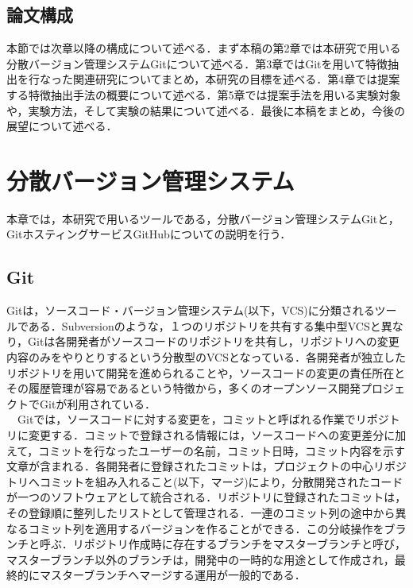 \documentclass{funthesis}
\begin{document}
\section{論文構成}
本節では次章以降の構成について述べる．まず本稿の第2章では本研究で用いる分散バージョン管理システムGitについて述べる．第3章ではGitを用いて特徴抽出を行なった関連研究についてまとめ，本研究の目標を述べる．第4章では提案する特徴抽出手法の概要について述べる．第5章では提案手法を用いる実験対象や，実験方法，そして実験の結果について述べる．最後に本稿をまとめ，今後の展望について述べる．
\chapter{分散バージョン管理システム} %

本章では，本研究で用いるツールである，分散バージョン管理システムGitと，GitホスティングサービスGitHubについての説明を行う．


\section{Git} %


Gitは，ソースコード・バージョン管理システム(以下，VCS)に分類されるツールである．Subversionのような，１つのリポジトリを共有する集中型VCSと異なり，Gitは各開発者がソースコードのリポジトリを共有し，リポジトリへの変更内容のみをやりとりするという分散型のVCSとなっている．各開発者が独立したリポジトリを用いて開発を進められることや，ソースコードの変更の責任所在とその履歴管理が容易であるという特徴から，多くのオープンソース開発プロジェクトでGitが利用されている．
\\　Gitでは，ソースコードに対する変更を，コミットと呼ばれる作業でリポジトリに変更する．コミットで登録される情報には，ソースコードへの変更差分に加えて，コミットを行なったユーザーの名前，コミット日時，コミット内容を示す文章が含まれる．各開発者に登録されたコミットは，プロジェクトの中心リポジトリへコミットを組み入れること(以下，マージ)により，分散開発されたコードが一つのソフトウェアとして統合される．リポジトリに登録されたコミットは，その登録順に整列したリストとして管理される．一連のコミット列の途中から異なるコミット列を適用するバージョンを作ることができる．この分岐操作をブランチと呼ぶ．リポジトリ作成時に存在するブランチをマスターブランチと呼び，マスターブランチ以外のブランチは，開発中の一時的な用途として作成され，最終的にマスターブランチへマージする運用が一般的である\cite{Matsubara}．
\end{document}
